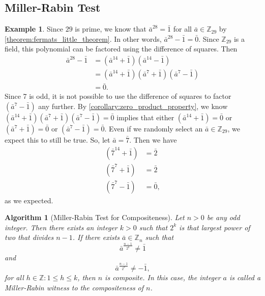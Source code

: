 \documentclass[12pt, titlepage]{amsart}
\newcommand\Z{{\mathbb Z}}
\newtheorem{algorithm}{Algorithm}[subsection]
\theoremstyle{definition}
\newtheorem{example}{Example}[subsection]
\begin{document}
	\subsection{Miller-Rabin Test}

	\begin{example}\label{example:miller-rabin_prime_modulus}
		Since $29$ is prime, we know that $\bar{a}^{28} = \bar{1}$ for all $\bar{a} \in \Z_{29}$ by \cref{theorem:fermats_little_theorem}. 
		In other words, $\bar{a}^{28}-\bar{1}=\bar{0}$.
		Since $\Z_{29}$ is a field, this polynomial can be factored using the difference of squares.
		Then
		\begin{align*}
		\bar{a}^{28}-\bar{1}
		&= (\bar{a}^{14}+\bar{1})(\bar{a}^{14}-\bar{1}) \\
		&= (\bar{a}^{14}+\bar{1})(\bar{a}^{7}+\bar{1})(\bar{a}^{7}-\bar{1}) \\
		&= \bar{0}.
		\end{align*}
		Since 7 is odd, it is not possible to use the difference of squares to factor $(\bar{a}^{7}-\bar{1})$ any further.
		By \cref{corollary:zero_product_property}, we know $(\bar{a}^{14}+\bar{1})(\bar{a}^{7}+\bar{1})(\bar{a}^{7}-\bar{1}) = \bar{0}$ implies that either $(\bar{a}^{14}+\bar{1})=\bar{0}$ or $(\bar{a}^{7}+\bar{1})=\bar{0}$ or $(\bar{a}^{7}-\bar{1})=\bar{0}$.
		Even if we randomly select an $\bar{a} \in \Z_{29}$, we expect this to still be true.
		So, let $\bar{a} = \bar{7}$.
		Then we have
		\begin{align*}
		(\bar{7}^{14}+\bar{1})&=\bar{2} \\
		(\bar{7}^{7}+\bar{1})&=\bar{2} \\
		(\bar{7}^{7}-\bar{1})&=\bar{0},
		\end{align*}
		as we expected.	
	\end{example}

	\begin{algorithm}[Miller-Rabin Test for Compositeness]\label{algorithm:miller-rabin}
		Let $n>0$ be any odd integer. 
		Then there exists an integer $k > 0$ such that $2^k$ is that largest power of two that divides $n-1$.
		If there exists $\bar{a} \in \Z_n$ such that  
		$$\bar{a}^{\frac{n-1}{2^k}} \neq \bar{1}$$ and 
		$$\bar{a}^{\frac{n-1}{2^h}} \neq -\bar{1},$$ 
		for all $h \in \Z : 1 \leq h \leq k$, then $n$ is composite. 
		In this case, the integer $a$ is called a Miller-Rabin witness to the compositeness of $n$.
	\end{algorithm}
	
\end{document}
